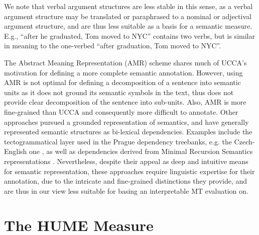 \documentclass[11pt]{article}
\newcommand{\oa}[1]{}
\def\parcite#1{\cite{#1}}
\begin{document}
We note that verbal argument structures are less stable in this sense, as a verbal
argument structure may be translated or paraphrased to a nominal or adjectival
argument structure, and are thus less suitable as a basis for a semantic measure.
E.g., ``after he graduated, Tom moved to NYC'' contains two verbs,
but is similar in meaning to the one-verbed
``after graduation, Tom moved to NYC''. 


The Abstract Meaning Representation (AMR) scheme \cite{banarescu2013abstract}
shares much of UCCA's motivation for defining a more complete semantic annotation.
However, using AMR is not optimal for defining a decomposition of a sentence into semantic
units as it does not ground its semantic symbols in the text,
thus does not provide clear decomposition of the sentence into sub-units.
Also, AMR is more fine-grained than UCCA and consequently more difficult to annotate.
Other approaches pursued a grounded representation of semantics,
and have generally represented semantic structures as bi-lexical dependencies.
Examples include the tectogrammatical layer \parcite{sgallhp:1986} used in the Prague dependency
treebanks, e.g. the Czech-English one \parcite{hajic2012announcing}, as well
as dependencies derived from Minimal Recursion Semantics representations \parcite{oepen2006discriminant}.
Nevertheless, despite their appeal as deep and intuitive means for semantic representation,
these approaches require linguistic expertise for their annotation, due to the intricate and
fine-grained distinctions they provide, and are thus in our view less suitable for basing
an interpretable MT evaluation on. 



\section{The HUME Measure}\label{sec:hume}
\end{document}
